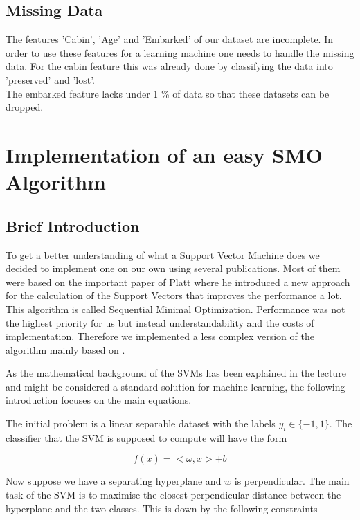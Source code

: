 \subsection{Missing Data}
The features 'Cabin', 'Age' and 'Embarked' of our dataset are incomplete. In order to use these features for a learning machine one needs to handle the missing data. For the cabin feature this was already done by classifying the data into 'preserved' and 'lost'.\\
The embarked feature lacks under 1 \% of data so that these datasets can be dropped.\\



\section{Implementation of an easy SMO Algorithm}
\subsection{Brief Introduction}
To get a better understanding of what a Support Vector Machine does we decided to implement one on our own using several publications. Most of them were based on the important paper of Platt \cite{platt} where he introduced a new approach for the calculation of the Support Vectors that improves the performance a lot. This algorithm is called Sequential Minimal Optimization. Performance was not the highest priority for us but instead understandability and the costs of implementation. Therefore we implemented a less complex version of the algorithm mainly based on \cite{smo}.

As the mathematical background of the SVMs has been explained in the lecture and might be considered a standard solution for machine learning, the following introduction focuses on the main equations.

The initial problem is a linear separable dataset with the labels $y_i \in \{-1, 1\}$. The classifier that the SVM is supposed to compute will have the form

\begin{equation}
    f(x) = <\omega, x> + b
\end{equation}

Now suppose we have a separating hyperplane and $w$ is perpendicular. The main task of the SVM is to maximise the closest perpendicular distance between the hyperplane and the two classes. This is down by the following constraints

